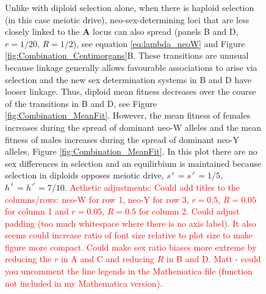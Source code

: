 \documentclass[12pt]{article}
\begin{document}
\begin{figure}
{Unlike with diploid selection alone, when there is haploid selection (in this case meiotic drive), neo-sex-determining loci that are less closely linked to the \textbf{A} locus can also spread (panels B and D, $r=1/20$, $R=1/2$), see equation \eqref{eq:lambda_neoW} and Figure \ref{fig:Combination_Centimorgans}B. 
These transitions are unusual because linkage generally allows favourable associations to arise via selection and the new sex determination systems in B and D have looser linkage. 
Thus, diploid mean fitness decreases over the course of the transitions in B and D, see Figure \ref{fig:Combination_MeanFit}.
However, the mean fitness of females increases during the spread of dominant neo-W alleles and the mean fitness of males increases during the spread of dominant neo-Y alleles, Figure \ref{fig:Combination_MeanFit}. 
In this plot there are no sex differences in selection and an equilirbium is maintained because selection in diploids opposes meiotic drive, $s^\female =s^\male = 1/5$, $h^\female = h^\male = 7/10$.
\textcolor{red}{Aethetic adjustments: Could add titles to the columns/rows: neo-W for row 1, neo-Y for row 3, $r=0.5$, $R=0.05$ for column 1 and $r=0.05$, $R=0.5$ for column 2. Could adjust padding (too much whitespace where there is no axis label). It also seems could increase ratio of font size relative to plot size to make figure more compact. Could make sex ratio biases more extreme by reducing the $r$ in A and C and reducing $R$ in B and D. Matt - could you uncomment the line legends in the Mathematica file (function not included in my Mathematica version).}
}
\label{fig:Combination_Turnover}
\end{figure}
\newpage
\end{document}
